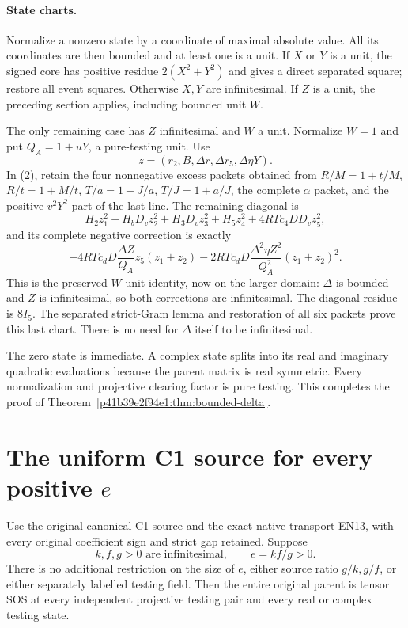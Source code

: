 \paragraph{State charts.}
Normalize a nonzero state by a coordinate of maximal absolute value.
All its coordinates are then bounded and at least one is a unit. If
$X$ or $Y$ is a unit, the signed core has positive residue
$2(X^2+Y^2)$ and gives a direct separated square; restore all event
squares. Otherwise $X,Y$ are infinitesimal. If $Z$ is a unit, the
preceding section applies, including bounded unit $W$.

The only remaining case has $Z$ infinitesimal and $W$ a unit.
Normalize $W=1$ and put $Q_A=1+uY$, a pure-testing unit. Use
\[
 z=(r_2,B,\Delta r,\Delta r_5,\Delta\eta Y).
\]
In (2), retain the four nonnegative excess packets obtained from
$R/M=1+t/M$, $R/t=1+M/t$, $T/a=1+J/a$, $T/J=1+a/J$,
the complete $\alpha$ packet, and the positive $v^2Y^2$ part of the
last line. The remaining diagonal is
\[
 H_2z_1^2+H_bD_vz_2^2+H_3D_vz_3^2+H_5z_4^2
                   +4RTc_4DD_vz_5^2,
\]
and its complete negative correction is exactly
\[
 -4RTc_dD\frac{\Delta Z}{Q_A}z_5(z_1+z_2)
 -2RTc_dD\frac{\Delta^2\eta Z^2}{Q_A^2}(z_1+z_2)^2.
\]
This is the preserved $W$-unit identity, now on the larger domain:
$\Delta$ is bounded and $Z$ is infinitesimal, so both corrections
are infinitesimal. The diagonal residue is $8I_5$. The separated
strict-Gram lemma and restoration of all six packets prove this
last chart. There is no need for $\Delta$ itself to be infinitesimal.

The zero state is immediate. A complex state splits into its real and
imaginary quadratic evaluations because the parent matrix is real
symmetric. Every normalization and projective clearing factor is
pure testing. This completes the proof of Theorem~\ref{p41b39e2f94e1:thm:bounded-delta}.



\section{\texorpdfstring{The uniform C1 source for every positive \(e\)}{The uniform C1 source for every positive e}}
\label{component:pf5d2f33f694c}

\label{pf5d2f33f694c:sec:uniform-c1-all-e-rederived}

Use the original canonical C1 source and the exact native transport
EN13, with every original coefficient sign and strict gap retained.
Suppose
\[
 k,f,g>0\text{ are infinitesimal},\qquad e=kf/g>0 .
 \tag{UE1}
\]
There is no additional restriction on the size of \(e\), either
source ratio \(g/k,g/f\), or either separately labelled testing field.
Then the entire original parent is tensor SOS at every independent
projective testing pair and every real or complex testing state.


